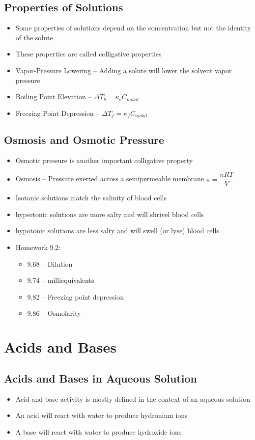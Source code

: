\documentclass[12pt, openany, letterpaper]{memoir}
\begin{document}
\section{Properties of Solutions}
\begin{itemize}
	\item Some properties of solutions depend on the concentration but not the identity of the solute
	\item These properties are called colligative properties
	\item Vapor-Pressure Lowering -- Adding a solute will lower the solvent vapor pressure
	\item Boiling Point Elevation -- $\Delta T_b = \kappa_b C_{molal}$
	\item Freezing Point Depression -- $\Delta T_f = \kappa_f C_{molal}$
\end{itemize}
\section{Osmosis and Osmotic Pressure}
\begin{itemize}
	\item Osmotic pressure is another important colligative property
	\item Osmosis -- Pressure exerted across a semipermeable membrane $\pi = \dfrac{nRT}{V}$
	\item Isotonic solutions match the salinity of blood cells
	\item hypertonic solutions are more salty and will shrivel blood cells
	\item hypotonic solutions are less salty and will swell (or lyse) blood cells
	\item Homework 9.2:
	\begin{itemize}
		\item 9.68 -- Dilution
		\item 9.74 -- milliequivalents
		\item 9.82 -- Freezing point depression
		\item 9.86 -- Osmolarity
	\end{itemize}
\end{itemize}

\chapter{Acids and Bases}
\section{Acids and Bases in Aqueous Solution}
\begin{itemize}
	\item Acid and base activity is mostly defined in the context of an aqueous solution
	\item An acid will react with water to produce hydronium ions
	\item A base will react with water to produce hydroxide ions
\end{itemize}	
\end{document}
